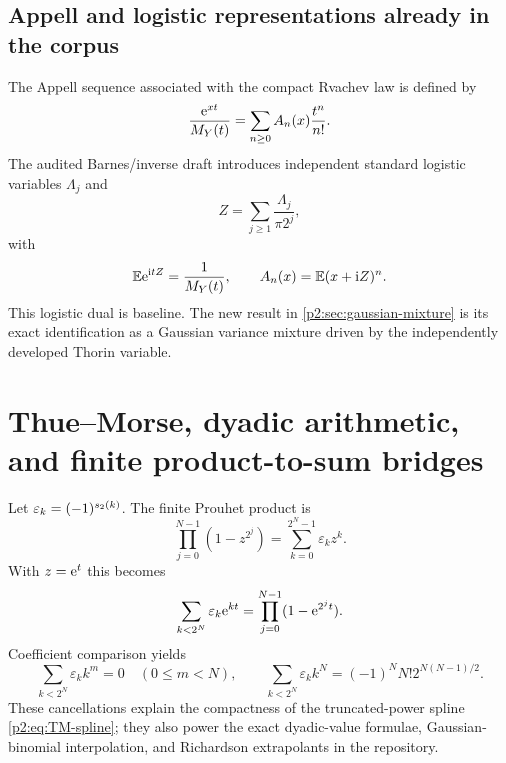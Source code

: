 \documentclass[11pt]{article}
\theoremstyle{definition}
\theoremstyle{remark}
\newcommand{\E}{\mathbb E}
\begin{document}
\subsection{Appell and logistic representations already in the corpus}

The Appell sequence associated with the compact Rvachev law is defined by
\begin{equation}
 \frac{\mathrm e^{xt}}{M_Y(t)}=\sum_{n\ge0}A_n(x)\frac{t^n}{n!}. \label{p2:eq:Appell}
\end{equation}
The audited Barnes/inverse draft introduces independent standard logistic variables
$\Lambda_j$ and
\begin{equation}
 Z=\sum_{j\ge1}\frac{\Lambda_j}{\pi2^j},                 \label{p2:eq:logistic-Z}
\end{equation}
with
\begin{equation}
 \E\e^{\ii tZ}=\frac{1}{M_Y(t)},
 \qquad
 A_n(x)=\E(x+\ii Z)^n.                                   \label{p2:eq:logistic-dual-baseline}
\end{equation}
This logistic dual is baseline.  The new result in \cref{p2:sec:gaussian-mixture} is its exact
identification as a Gaussian variance mixture driven by the independently developed Thorin
variable.

\section{Thue--Morse, dyadic arithmetic, and finite product-to-sum bridges}
\label{p2:sec:thue-morse}

Let $\varepsilon_k=(-1)^{s_2(k)}$.  The finite Prouhet product is
\begin{equation}
 \prod_{j=0}^{N-1}(1-z^{2^j})
 =\sum_{k=0}^{2^N-1}\varepsilon_kz^k.                    \label{p2:eq:Prouhet-product}
\end{equation}
With $z=\mathrm e^t$ this becomes
\begin{equation}
 \sum_{k<2^N}\varepsilon_k\mathrm e^{kt}
 =\prod_{j=0}^{N-1}(1-\mathrm e^{2^jt}).                         \label{p2:eq:Prouhet-exponential}
\end{equation}
Coefficient comparison yields
\begin{equation}
 \sum_{k<2^N}\varepsilon_kk^m=0\quad(0\le m<N),
 \qquad
 \sum_{k<2^N}\varepsilon_kk^N
 =(-1)^NN!2^{N(N-1)/2}.                                  \label{p2:eq:Prouhet-sharp}
\end{equation}
These cancellations explain the compactness of the truncated-power spline
\eqref{p2:eq:TM-spline}; they also power the exact dyadic-value formulae, Gaussian-binomial
interpolation, and Richardson extrapolants in the repository.
\end{document}

